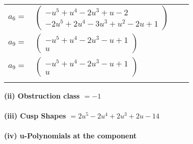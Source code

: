 \documentclass[1p]{elsarticle_modified}
\theoremstyle{definition}
\begin{document}
\begin{tabular}{m{7pt} m{180pt} m{7pt} m{180pt} }
\flushright $a_{6}=$&$\begin{pmatrix}- u^5+u^4-2 u^3+u-2\\-2 u^5+2 u^4-3 u^3+u^2-2 u+1\end{pmatrix}$ \\
\flushright $a_{9}=$&$\begin{pmatrix}- u^5+u^4-2 u^3- u+1\\u\end{pmatrix}$\\ \flushright $a_{9}=$&$\begin{pmatrix}- u^5+u^4-2 u^3- u+1\\u\end{pmatrix}$\\&\end{tabular}
\flushleft \textbf{(ii) Obstruction class $= -1$}\\~\\
\flushleft \textbf{(iii) Cusp Shapes $= 2 u^5-2 u^4+2 u^3+2 u-14$}\\~\\
\newpage\renewcommand{\arraystretch}{1}
\flushleft \textbf{(iv) u-Polynomials at the component}\newline \\
\end{document}

